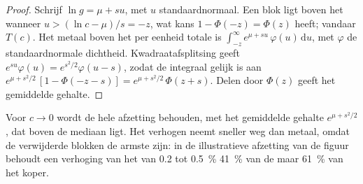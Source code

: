 \begin{proof}
Schrijf $\ln g = \mu + s u$, met $u$ standaardnormaal. Een blok ligt boven het  wanneer $u > (\ln c -
\mu)/s = -z$, wat kans $1 - \Phi(-z) = \Phi(z)$ heeft; vandaar $T(c)$. Het metaal boven het
 per eenheid totale  is $\int_{-z}^{\infty} e^{\mu + s u}\,\varphi(u)\,\mathrm{d}u$,
met $\varphi$ de standaardnormale dichtheid. Kwadraatafsplitsing geeft $e^{su}\varphi(u) =
e^{s^2/2}\varphi(u - s)$, zodat de integraal gelijk is aan $e^{\mu + s^2/2}\,[1 - \Phi(-z - s)] = e^{\mu +
s^2/2}\,\Phi(z + s)$. Delen door $\Phi(z)$ geeft het gemiddelde gehalte.
\end{proof}

Voor $c \to 0$ wordt de hele afzetting behouden, met het gemiddelde gehalte $e^{\mu + s^2/2}$, dat boven de
mediaan ligt. Het  verhogen neemt sneller  weg dan metaal, omdat de verwijderde blokken de
armste zijn: in de illustratieve afzetting van de figuur behoudt een verhoging van het  van 0.2 tot
\qty{0.5}{\percent} \qty{41}{\percent} van de  maar \qty{61}{\percent} van het koper.

